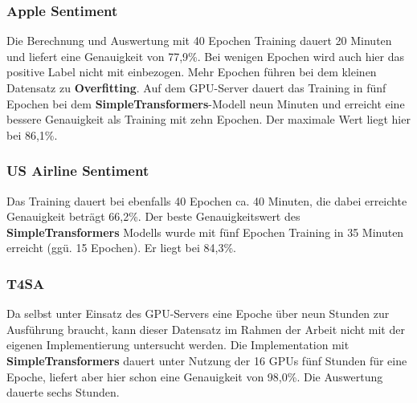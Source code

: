 \subsubsection*{Apple Sentiment}
Die Berechnung und Auswertung mit 40 Epochen Training dauert 20 Minuten und liefert eine Genauigkeit von 77,9\%. Bei wenigen Epochen wird auch hier das positive Label nicht mit einbezogen. Mehr Epochen f\"uhren bei dem kleinen Datensatz zu \textbf{Overfitting}.
Auf dem GPU-Server dauert das Training in f\"unf Epochen bei dem \textbf{SimpleTransformers}-Modell neun Minuten und erreicht eine bessere Genauigkeit als Training mit zehn Epochen. Der maximale Wert liegt hier bei 86,1\%.

\subsubsection*{US Airline Sentiment}
Das Training dauert bei ebenfalls 40 Epochen ca. 40 Minuten, die dabei erreichte Genauigkeit betr\"agt 66,2\%.
Der beste Genauigkeitswert des \textbf{SimpleTransformers} Modells wurde mit f\"unf Epochen Training in 35 Minuten erreicht (gg\"u. 15 Epochen). Er liegt bei 84,3\%.

\subsubsection*{T4SA}
Da selbst unter Einsatz des GPU-Servers eine Epoche \"uber neun Stunden zur Ausf\"uhrung braucht, kann dieser Datensatz im Rahmen der Arbeit nicht mit der eigenen Implementierung untersucht werden.
Die Implementation mit \textbf{SimpleTransformers} dauert unter Nutzung der 16 GPUs f\"unf Stunden f\"ur eine Epoche, liefert aber hier schon eine Genauigkeit von 98,0\%. Die Auswertung dauerte sechs Stunden.

